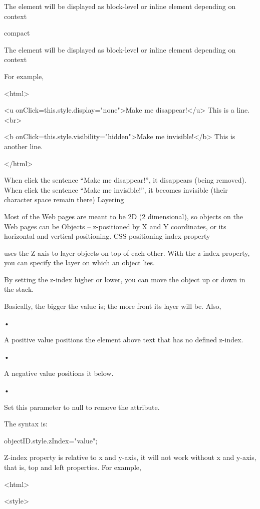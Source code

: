 \documentclass[
]{article}
\begin{document}
The element will be displayed as block-level or inline element depending
on context

compact

The element will be displayed as block-level or inline element depending
on context

For example,

\textless html\textgreater{}

\textless u onClick=this.style.display="none"\textgreater Make me
disappear!\textless/u\textgreater{} This is a
line.\textless br\textgreater{}

\textless b onClick=this.style.visibility="hidden"\textgreater Make me
invisible!\textless/b\textgreater{} This is another line.

\textless/html\textgreater{}

When click the sentence ``Make me disappear!'', it disappears (being
removed). When click the sentence ``Make me invisible!'', it becomes
invisible (their character space remain there) Layering

Most of the Web pages are meant to be 2D (2 dimensional), so objects on
the Web pages can be Objects -- z-positioned by X and Y coordinates, or
its horizontal and vertical positioning. CSS positioning index property

uses the Z axis to layer objects on top of each other. With the z-index
property, you can specify the layer on which an object lies.

By setting the z-index higher or lower, you can move the object up or
down in the stack.

Basically, the bigger the value is; the more front its layer will be.
Also,

•

A positive value positions the element above text that has no defined
z-index.

•

A negative value positions it below.

•

Set this parameter to null to remove the attribute.

The syntax is:

objectID.style.zIndex="value";

Z-index property is relative to x and y-axis, it will not work without x
and y-axis, that is, top and left properties. For example,

\textless html\textgreater{}

\textless style\textgreater{}
\end{document}
